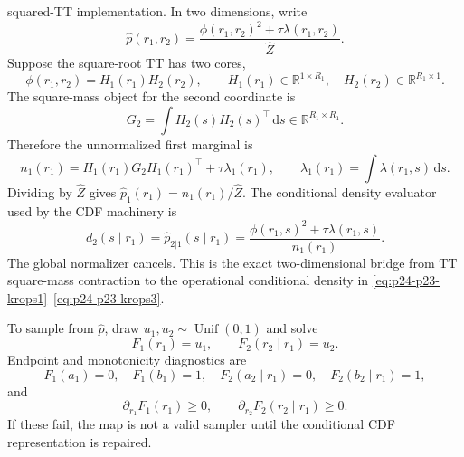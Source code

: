 \documentclass[11pt]{article}
\numberwithin{equation}{section}
\newcommand{\R}{\mathbb R}
\newcommand{\dd}{\,\mathrm d}
\begin{document}
squared-TT implementation.  In two dimensions, write
\begin{equation}
    \widehat p(r_1,r_2)
    =
    \frac{\phi(r_1,r_2)^2+\tau\lambda(r_1,r_2)}
    {\widehat Z}.
    \label{eq:p24-p23-kr2-8a}
\end{equation}
Suppose the square-root TT has two cores,
\begin{equation}
    \phi(r_1,r_2)
    =
    H_1(r_1)H_2(r_2),
    \qquad
    H_1(r_1)\in\R^{1\times R_1},\quad
    H_2(r_2)\in\R^{R_1\times1}.
    \label{eq:p24-p23-kr2-8b}
\end{equation}
The square-mass object for the second coordinate is
\begin{equation}
    G_2
    =
    \int H_2(s)H_2(s)^\top\dd s
    \in\R^{R_1\times R_1}.
    \label{eq:p24-p23-kr2-8c}
\end{equation}
Therefore the unnormalized first marginal is
\begin{equation}
    n_1(r_1)
    =
    H_1(r_1)G_2H_1(r_1)^\top
    +
    \tau\lambda_1(r_1),
    \qquad
    \lambda_1(r_1)=\int\lambda(r_1,s)\dd s.
    \label{eq:p24-p23-kr2-8d}
\end{equation}
Dividing by \(\widehat Z\) gives \(\widehat p_1(r_1)=n_1(r_1)/\widehat Z\).
The conditional density evaluator used by the CDF machinery is
\begin{equation}
    d_2(s\mid r_1)
    =
    \widehat p_{2|1}(s\mid r_1)
    =
    \frac{\phi(r_1,s)^2+\tau\lambda(r_1,s)}
    {n_1(r_1)}.
    \label{eq:p24-p23-kr2-8e}
\end{equation}
The global normalizer cancels.  This is the exact two-dimensional bridge from
TT square-mass contraction to the operational conditional density in
\eqref{eq:p24-p23-krops1}--\eqref{eq:p24-p23-krops3}.

To sample from \(\widehat p\), draw \(u_1,u_2\sim\operatorname{Unif}(0,1)\)
and solve
\begin{equation}
    F_1(r_1)=u_1,
    \qquad
    F_2(r_2\mid r_1)=u_2.
    \label{eq:p24-p23-kr2-9}
\end{equation}
Endpoint and monotonicity diagnostics are
\begin{equation}
    F_1(a_1)=0,\quad F_1(b_1)=1,\quad
    F_2(a_2\mid r_1)=0,\quad F_2(b_2\mid r_1)=1,
    \label{eq:p24-p23-kr2-10}
\end{equation}
and
\begin{equation}
    \partial_{r_1}F_1(r_1)\ge0,
    \qquad
    \partial_{r_2}F_2(r_2\mid r_1)\ge0.
    \label{eq:p24-p23-kr2-11}
\end{equation}
If these fail, the map is not a valid sampler until the conditional CDF
representation is repaired.
\end{document}
